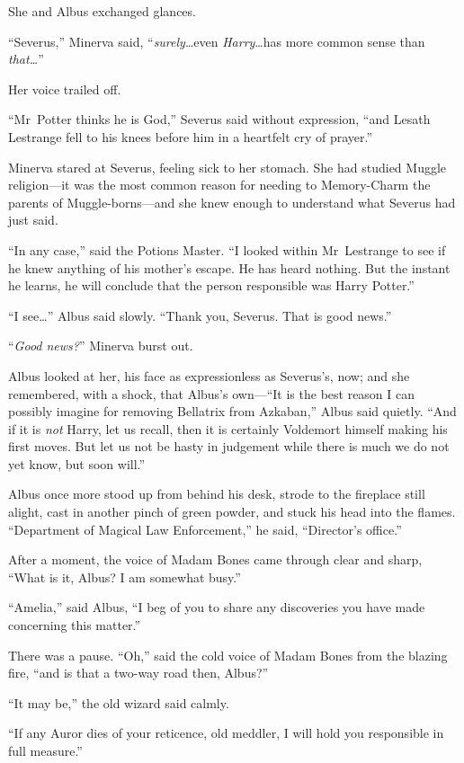 She and Albus exchanged glances.

“Severus,” Minerva said, “\emph{surely}…even \emph{Harry}…has more common sense than \emph{that…}”

Her voice trailed off.

“Mr~Potter thinks he is God,” Severus said without expression, “and Lesath Lestrange fell to his knees before him in a heartfelt cry of prayer.”

Minerva stared at Severus, feeling sick to her stomach. She had studied Muggle religion—it was the most common reason for needing to Memory-Charm the parents of Muggle-borns—and she knew enough to understand what Severus had just said.

“In any case,” said the Potions Master. “I looked within Mr~Lestrange to see if he knew anything of his mother’s escape. He has heard nothing. But the instant he learns, he will conclude that the person responsible was Harry Potter.”

“I see…” Albus said slowly. “Thank you, Severus. That is good news.”

“\emph{Good news?}” Minerva burst out.

Albus looked at her, his face as expressionless as Severus’s, now; and she remembered, with a shock, that Albus’s own—“It is the best reason I can possibly imagine for removing Bellatrix from Azkaban,” Albus said quietly. “And if it is \emph{not} Harry, let us recall, then it is certainly Voldemort himself making his first moves. But let us not be hasty in judgement while there is much we do not yet know, but soon will.”

Albus once more stood up from behind his desk, strode to the fireplace still alight, cast in another pinch of green powder, and stuck his head into the flames. “Department of Magical Law Enforcement,” he said, “Director’s office.”

After a moment, the voice of Madam Bones came through clear and sharp, “What is it, Albus? I am somewhat busy.”

“Amelia,” said Albus, “I beg of you to share any discoveries you have made concerning this matter.”

There was a pause. “Oh,” said the cold voice of Madam Bones from the blazing fire, “and is that a two-way road then, Albus?”

“It may be,” the old wizard said calmly.

“If any Auror dies of your reticence, old meddler, I will hold you responsible in full measure.”

